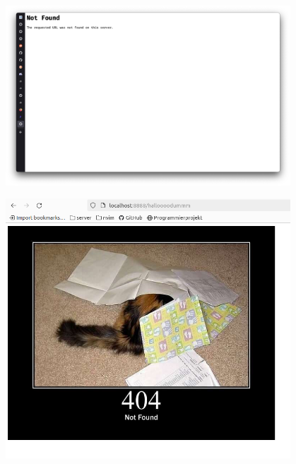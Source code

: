 \documentclass[aspectratio=169]{beamer}
\begin{document}
\begin{frame}[c]{}
  \centering
\includegraphics[width=0.8\textwidth,height=\textheight,keepaspectratio]{00_errors1.png}
\end{frame}

\begin{frame}[c]{}
  \centering
\includegraphics[width=0.8\textwidth,height=\textheight,keepaspectratio]{02_http_cats.png}
\end{frame}
\end{document}
